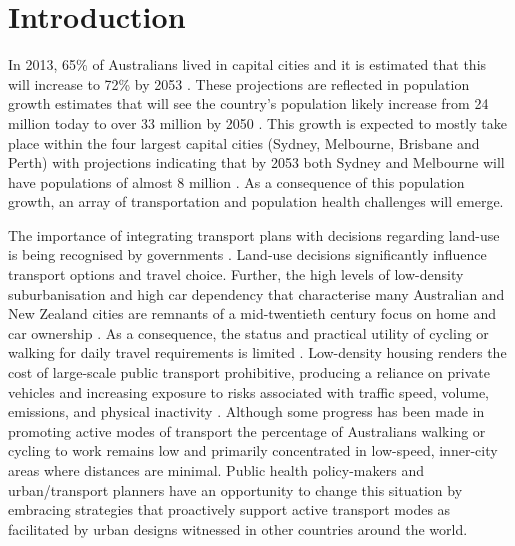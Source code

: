 \documentclass[sageh,times]{sagej}
\begin{document}

\maketitle


\section{Introduction}\label{sec:introduction}



 
In 2013, 65\% of Australians lived in capital cities and it is estimated that this will increase to 72\% by 2053  \citep{ABS2008}. These projections are reflected in population growth estimates that will see the country's population likely increase from 24 million today to over 33 million by 2050  \citep{ABS2008}. This growth is expected to mostly take place within the four largest capital cities (Sydney, Melbourne, Brisbane and Perth) with projections indicating that by 2053 both Sydney and Melbourne will have populations of almost 8 million  \citep{CommonwealthofAustralia2010}. As a consequence of this population growth, an array of transportation and population health challenges will emerge.

The importance of integrating transport plans with decisions regarding land-use is being recognised by governments \citep{ATAP2016,SAustralia2015}. Land-use decisions significantly influence transport options and travel choice. Further, the high levels of low-density suburbanisation and high car dependency that characterise many Australian and New Zealand cities are remnants of a mid-twentieth century focus on home and car ownership \citep{Currie2007,Dodson2008}. As a consequence, the status and practical utility of cycling or walking for daily travel requirements is limited \citep{Heesch2014,Daley2011}. Low-density housing renders the cost of large-scale public transport prohibitive, producing a reliance on private vehicles and increasing exposure to risks associated with traffic speed, volume, emissions, and physical inactivity  \citep{Cepeda2016,MingWen2008,Norman2006}. Although some progress has been made in promoting active modes of transport the percentage of Australians walking or cycling to work remains low and primarily concentrated in low-speed, inner-city areas where distances are minimal. Public health policy-makers and urban/transport planners have an opportunity to change this situation by embracing strategies that proactively support active transport modes as facilitated by urban designs witnessed in other countries around the world.
\end{document}
